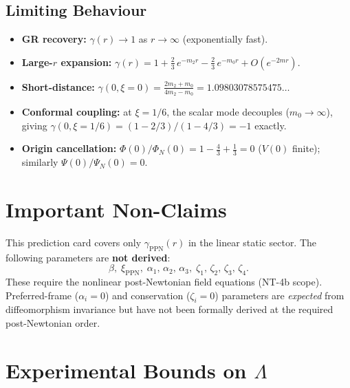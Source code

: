 \documentclass[11pt,a4paper]{article}
\begin{document}
\subsection{Limiting Behaviour}

\begin{itemize}[leftmargin=2em]
  \item \textbf{GR recovery:} $\gamma(r) \to 1$ as $r \to \infty$
  (exponentially fast).
  \item \textbf{Large-$r$ expansion:}
  $\gamma(r) = 1 + \tfrac{2}{3}\,e^{-m_2 r} - \tfrac{2}{3}\,e^{-m_0 r}
  + O(e^{-2mr})$.
  \item \textbf{Short-distance:}
  $\gamma(0,\xi\!=\!0) = \frac{2m_2 + m_0}{4m_2 - m_0}
  = 1.09803078575475\ldots$
  \item \textbf{Conformal coupling:} at $\xi = 1/6$, the scalar mode
  decouples ($m_0 \to \infty$), giving
  $\gamma(0,\xi\!=\!1/6) = (1-2/3)/(1-4/3) = -1$ exactly.
  \item \textbf{Origin cancellation:}
  $\Phi(0)/\Phi_N(0) = 1 - \tfrac{4}{3} + \tfrac{1}{3} = 0$
  ($V(0)$ finite); similarly $\Psi(0)/\Psi_N(0) = 0$.
\end{itemize}

\section{Important Non-Claims}

This prediction card covers only $\gamma_{\mathrm{PPN}}(r)$ in the linear static
sector.  The following parameters are \textbf{not derived}:
\[
  \beta,\; \xi_{\mathrm{PPN}},\;
  \alpha_1,\,\alpha_2,\,\alpha_3,\;
  \zeta_1,\,\zeta_2,\,\zeta_3,\,\zeta_4.
\]
These require the nonlinear post-Newtonian field equations (NT-4b scope).
Preferred-frame ($\alpha_i = 0$) and conservation ($\zeta_i = 0$) parameters are
\emph{expected} from diffeomorphism invariance but have not been formally
derived at the required post-Newtonian order.

\section{Experimental Bounds on $\Lambda$}
\end{document}
